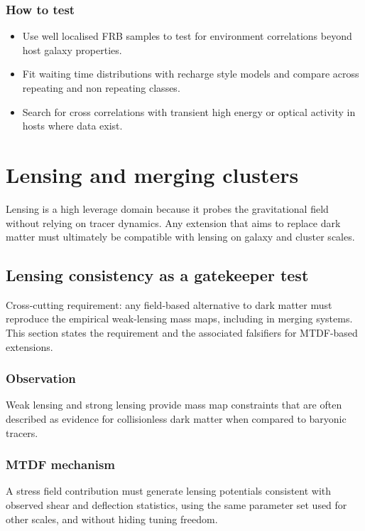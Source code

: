 \documentclass[11pt,a4paper]{article}
\begin{document}
\subsubsection{How to test}
\begin{itemize}
  \item Use well localised FRB samples to test for environment correlations beyond host galaxy properties.
  \item Fit waiting time distributions with recharge style models and compare across repeating and non repeating classes.
  \item Search for cross correlations with transient high energy or optical activity in hosts where data exist.
\end{itemize}

\section{Lensing and merging clusters}
\label{sec:lensing}
Lensing is a high leverage domain because it probes the gravitational field without relying on tracer dynamics. Any extension that aims to replace dark matter must ultimately be compatible with lensing on galaxy and cluster scales.

\subsection{Lensing consistency as a gatekeeper test}
\begin{mdframed}[linecolor=accent,linewidth=0.5pt,backgroundcolor=callout-bg,leftline=true,rightline=true,topline=true,bottomline=true,innerleftmargin=8pt,innerrightmargin=8pt,innertopmargin=6pt,innerbottommargin=6pt]
Cross-cutting requirement: any field-based alternative to dark matter must reproduce the empirical weak-lensing mass maps, including in merging systems. This section states the requirement and the associated falsifiers for MTDF-based extensions.
\end{mdframed}

\subsubsection{Observation}
Weak lensing and strong lensing provide mass map constraints that are often described as evidence for collisionless dark matter when compared to baryonic tracers.

\subsubsection{MTDF mechanism}
A stress field contribution must generate lensing potentials consistent with observed shear and deflection statistics, using the same parameter set used for other scales, and without hiding tuning freedom.
\end{document}
